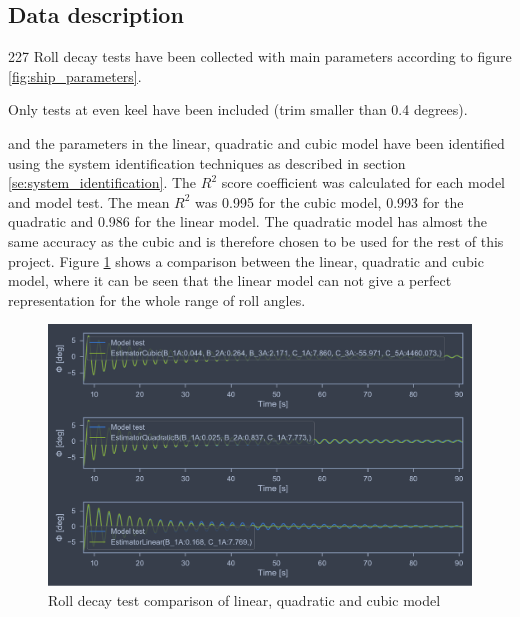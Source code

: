 

\subsection{Data description}

227 Roll decay tests have been collected with main parameters according to figure \ref{fig:ship_parameters}. 

Only tests at even keel have been included (trim smaller than 0.4 degrees). 


and the parameters in the linear, quadratic and cubic model have been identified using the system identification techniques as described in section \ref{se:system_identification}. The $R^2$ score coefficient was calculated for each model and model test. The mean $R^2$ was 0.995 for the cubic model, 0.993 for the quadratic and 0.986 for the linear model. The quadratic model has almost the same accuracy as the cubic and is therefore chosen to be used for the rest of this project. Figure \ref{fig:roll_decay_model_compare} shows a comparison between the linear, quadratic and cubic model, where it can be seen that the linear model can not give a perfect representation for the whole range of roll angles.    

\begin{figure}[H]
    \centering
    \includegraphics[width=0.9\columnwidth]{figures/roll_decay_model_compare.pdf}
    \caption{Roll decay test comparison of linear, quadratic and cubic model}
    \label{fig:roll_decay_model_compare}
\end{figure}

